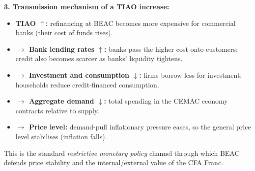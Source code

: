 \documentclass[11pt]{article}
\begin{document}
\begin{corrige}
\textbf{3. Transmission mechanism of a TIAO increase:}
\begin{itemize}
\item \textbf{TIAO $\uparrow$:} refinancing at BEAC becomes more expensive for commercial banks (their cost of funds rises).
\item \textbf{$\rightarrow$ Bank lending rates $\uparrow$:} banks pass the higher cost onto customers; credit also becomes scarcer as banks' liquidity tightens.
\item \textbf{$\rightarrow$ Investment and consumption $\downarrow$:} firms borrow less for investment; households reduce credit-financed consumption.
\item \textbf{$\rightarrow$ Aggregate demand $\downarrow$:} total spending in the CEMAC economy contracts relative to supply.
\item \textbf{$\rightarrow$ Price level:} demand-pull inflationary pressure eases, so the general price level stabilises (inflation falls).
\end{itemize}
This is the standard \emph{restrictive monetary policy} channel through which BEAC defends price stability and the internal/external value of the CFA Franc.
\end{corrige}
\end{document}
